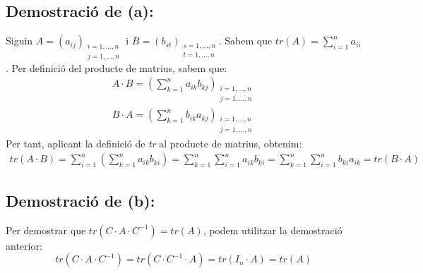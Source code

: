 \documentclass[a4paper, 11pt]{article}
\begin{document}
        \subsection*{Demostraci\'o de (a):}
            Siguin ${A = (a_{ij})_{\substack{i=1,\dots,n\\j=1,\dots,n}}}$ i ${B=(b_{st})_{\substack{s=1,\dots,n\\t=1,\dots,n}}}$. Sabem que ${tr(A) = \sum^n_{i=1} a_{ii}}$. Per definici\'o del producte de matrius, sabem que:
            \begin{gather*}
                A\cdot B = \left(\sum^n_{k=1}a_{ik}b_{kj}\right)_{\substack{i=1,\dots,n\\j=1,\dots,n}}\\
                B\cdot A = \left(\sum^n_{k=1}b_{ik}a_{kj}\right)_{\substack{i=1,\dots,n\\j=1,\dots,n}}
            \end{gather*}
            Per tant, aplicant la definici\'o de \emph{tr} al producte de matrius, obtenim:
            \begin{gather*}
                tr(A\cdot B) = \sum^n_{i=1}\left(\sum^n_{k=1}a_{ik}b_{ki}\right) = \sum^n_{k=1}\sum^n_{i=1}a_{ik}b_{ki} = \sum^n_{k=1}\sum^n_{i=1}b_{ki}a_{ik} = tr(B\cdot A)
            \end{gather*}

        \subsection*{Demostraci\'o de (b):}
            Per demostrar que ${tr(C\cdot A \cdot C^{-1}) = tr(A)}$, podem utilitzar la demostraci\'o anterior:
            \begin{equation*}
                tr(C\cdot A \cdot C^{-1}) = tr(C \cdot C^{-1} \cdot A) = tr(I_n \cdot A) = tr(A)
            \end{equation*}
\end{document}
